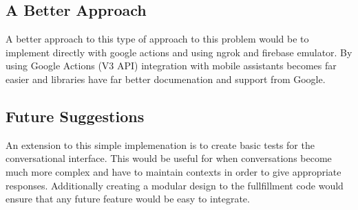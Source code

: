\documentclass[9pt,software]{livecoms}
\begin{document}
\subsection{A Better Approach}
A better approach to this type of approach to this problem would be to implement directly with google actions and using ngrok and firebase emulator. By using Google Actions (V3 API) integration with mobile assistants becomes far 
easier and libraries have far better documenation and support from Google.

\subsection{Future Suggestions}
An extension to this simple implemenation is to create basic tests for the conversational interface. This would be useful for when conversations become much more complex and have to 
maintain contexts in order to give appropriate responses. Additionally creating a modular design to the fullfillment code would ensure that any future feature would be easy to integrate.



\end{document}
